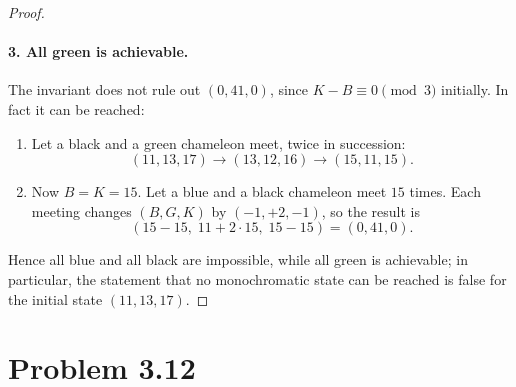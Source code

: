 \documentclass[12pt]{article}
\begin{document}
\begin{proof}
\paragraph{3. All green is achievable.}
The invariant does not rule out $(0, 41, 0)$, since $K - B \equiv 0 \pmod 3$
initially. In fact it can be reached:
\begin{enumerate}
  \item Let a black and a green chameleon meet, twice in succession:
  \[
    (11, 13, 17) \longrightarrow (13, 12, 16) \longrightarrow (15, 11, 15).
  \]
  \item Now $B = K = 15$. Let a blue and a black chameleon meet $15$ times.
  Each meeting changes $(B, G, K)$ by $(-1, +2, -1)$, so the result is
  \[
    (15 - 15,\; 11 + 2 \cdot 15,\; 15 - 15) = (0, 41, 0).
  \]
\end{enumerate}
 
Hence all blue and all black are impossible, while all green is achievable;
in particular, the statement that no monochromatic state can be reached is
false for the initial state $(11, 13, 17)$.
\end{proof}
 

\section*{Problem 3.12}
\end{document}
